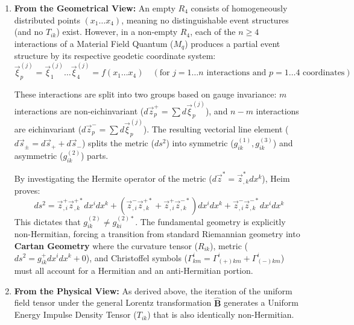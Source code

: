 \documentclass[11pt,a4paper,oneside]{article}
\begin{document}
\begin{enumerate}
    \item \textbf{From the Geometrical View:} An empty $R_4$ consists of homogeneously distributed points $(x_1 \dots x_4)$, meaning no distinguishable event structures (and no $T_{ik}$) exist. However, in a non-empty $R_4$, each of the $n \ge 4$ interactions of a Material Field Quantum ($M_q$) produces a partial event structure by its respective geodetic coordinate system:
    \begin{equation}
        \vec{\xi}_p^{(j)} = \vec{\xi}_1^{(j)} \dots \vec{\xi}_4^{(j)} = f(x_1 \dots x_4) \quad (\text{for } j = 1 \dots n \text{ interactions and } p = 1 \dots 4 \text{ coordinates})
    \end{equation}
    
    These interactions are split into two groups based on gauge invariance: $m$ interactions are non-eichinvariant ($d\vec{z}_p^+ = \sum d\vec{\xi}_p^{(j)}$), and $n-m$ interactions are eichinvariant ($d\vec{z}_p^- = \sum d\vec{\xi}_p^{(j)}$). The resulting vectorial line element ($d\vec{s}_{\pm} = d\vec{s}_+ + d\vec{s}_-$) splits the metric ($ds^2$) into symmetric ($g_{ik}^{(1)}, g_{ik}^{(3)}$) and asymmetric ($g_{ik}^{(2)}$) parts. 
    
    By investigating the Hermite operator of the metric ($d\vec{z}^* = \vec{z}_{,k}^* dx^k$), Heim proves:
    \begin{equation}
        ds^2 = \vec{z}_{,i}^+ \vec{z}_{,k}^{+*} dx^i dx^k + \left(\vec{z}_{,i}^- \vec{z}_{,k}^{+*} + \vec{z}_{,i}^+ \vec{z}_{,k}^{-*}\right) dx^i dx^k + \vec{z}_{,i}^- \vec{z}_{,k}^{-*} dx^i dx^k
    \end{equation}
    This dictates that $g_{ik}^{(2)} \neq g_{ki}^{(2)*}$. The fundamental geometry is explicitly non-Hermitian, forcing a transition from standard Riemannian geometry into \textbf{Cartan Geometry} where the curvature tensor ($R_{ik}$), metric ($ds^2 = g_{ik}^+ dx^i dx^k + 0$), and Christoffel symbols ($\Gamma_{km}^i = \Gamma_{(+)km}^i + \Gamma_{(-)km}^i$) must all account for a Hermitian and an anti-Hermitian portion.
    
    \item \textbf{From the Physical View:} As derived above, the iteration of the uniform field tensor under the general Lorentz transformation $\mathbf{\hat{B}}$ generates a Uniform Energy Impulse Density Tensor ($T_{ik}$) that is also identically non-Hermitian.
    

\end{enumerate}
\end{document}

